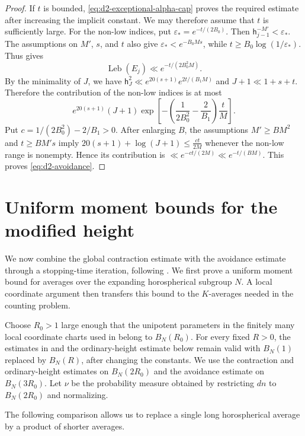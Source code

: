 \documentclass[reqno,11pt]{amsart}
\theoremstyle{definition}
\theoremstyle{remark}
\numberwithin{equation}{section}
\newcommand{\Leb}{\operatorname{Leb}}
\begin{document}
\begin{proof}
If $t$ is bounded, \eqref{eq:d2-exceptional-alpha-cap} proves the required estimate after increasing the implicit constant. We may therefore assume that $t$ is sufficiently large. For the non-low indices, put $\varepsilon_*=e^{-t/(2B_0)}$. Then $\mathsf h_{j-1}^{-M'}<\varepsilon_*$. The assumptions on $M'$, $s$, and $t$ also give $\varepsilon_*<e^{-B_0Ms}$, while $t\ge B_0\log(1/\varepsilon_*)$. Thus  gives
$$
\Leb(E_j)\ll e^{-t/(2B_0^2M)}.
$$
By the minimality of $J$, we have $\mathsf h_J^2\ll e^{20(s+1)}e^{2t/(B_1M)}$ and $J+1\ll1+s+t$. Therefore the contribution of the non-low indices is at most
$$
e^{20(s+1)}(J+1)\exp\left[-\left(\frac1{2B_0^2}-\frac2{B_1}\right)\frac tM\right].
$$
Put $c=1/(2B_0^2)-2/B_1>0$. After enlarging $B$, the assumptions $M'\ge BM^2$ and $t\ge BM's$ imply $20(s+1)+\log(J+1)\le\frac{ct}{2M}$ whenever the non-low range is nonempty. Hence its contribution is $\ll e^{-ct/(2M)}\ll e^{-t/(BM)}$. This proves \eqref{eq:d2-avoidance}.
\end{proof}
\section{Uniform moment bounds for the modified height}
\label{s:iterations}

We now combine the global contraction estimate with the avoidance estimate
through a stopping-time iteration, following
\cite[Section~6]{Kim}. We first prove a uniform moment bound for averages
over the expanding horospherical subgroup $N$. A local coordinate argument
then transfers this bound to the $K$-averages needed in the counting
problem.

Choose $R_0>1$ large enough that the unipotent parameters in the finitely
many local coordinate charts used in
\cite[Subsection~7.2]{Kim} belong to $B_N(R_0)$. For every fixed $R>0$,
the estimates in  and the
ordinary-height estimate below remain valid with $B_N(1)$ replaced by
$B_N(R)$, after changing the constants. We use the contraction and
ordinary-height estimates on $B_N(2R_0)$ and the avoidance estimate on
$B_N(3R_0)$. Let $\nu$ be the probability measure obtained by restricting
$dn$ to $B_N(2R_0)$ and normalizing.

The following comparison allows us to replace a single long
horospherical average by a product of shorter averages.
\end{document}
